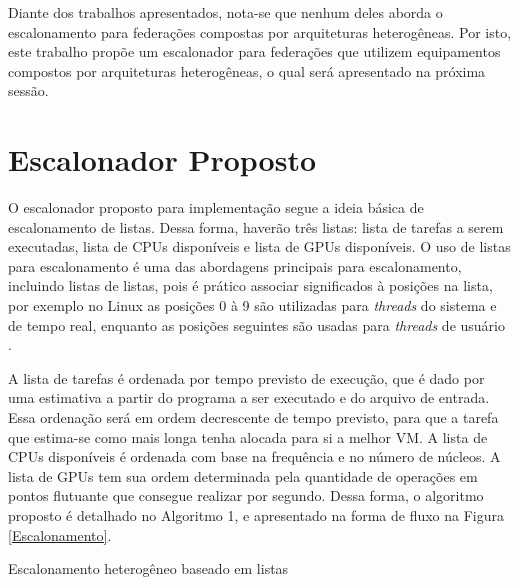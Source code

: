 Diante dos trabalhos apresentados, nota-se que nenhum deles aborda o escalonamento para federações compostas por arquiteturas heterogêneas. Por isto, este trabalho propõe um escalonador para federações que utilizem equipamentos compostos por arquiteturas heterogêneas, o qual será apresentado na próxima sessão.

\section{Escalonador Proposto}

O escalonador proposto para implementação segue a ideia básica de escalonamento de listas. Dessa forma, haverão três listas: lista de tarefas a serem executadas, lista de \acrshort{CPU}s disponíveis e lista de \acrshort{GPU}s disponíveis. O uso de listas para escalonamento é uma das abordagens principais para escalonamento, incluindo listas de listas\cite{MultilevelFQ}, pois é prático associar significados à posições na lista, por exemplo no Linux as posições 0 à 9 são utilizadas para \textit{threads} do sistema e de tempo real, enquanto as posições seguintes são usadas para \textit{threads} de usuário \cite{KernelsComp}.

A lista de tarefas é ordenada por tempo previsto de execução, que é dado por uma estimativa a partir do programa a ser executado e do arquivo de entrada. Essa ordenação será em ordem decrescente de tempo previsto, para que a tarefa que estima-se como mais longa tenha alocada para si a melhor \acrshort{VM}. A lista de \acrshort{CPU}s disponíveis é ordenada com base na frequência e no número de núcleos. A lista de \acrshort{GPU}s tem sua ordem determinada pela quantidade de operações em pontos flutuante que consegue realizar por segundo. Dessa forma, o algoritmo proposto é detalhado no Algoritmo 1, e apresentado na forma de fluxo na Figura \ref{Escalonamento}.

\begin{algorithm}
\caption{Escalonamento heterogêneo baseado em listas}
\begin{algorithmic}
			\Else
			\EndIf
		\Else
		\EndIf
	\EndWhile
\EndProcedure
\end{algorithmic}
\end{algorithm}

